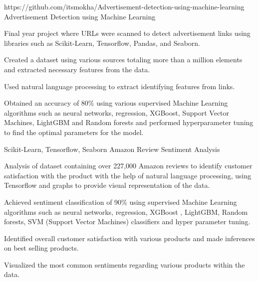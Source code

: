 \begin{cventries}
  \cventry
    {https://github.com/itsmokha/Advertisement-detection-using-machine-learning} %
    {Advertisement Detection using Machine Learning} %
    {}
    {}
    {
      \begin{cvitems} %
		\item Final year project where URLs were scanned to detect advertisement links using libraries such as Scikit-Learn, Tensorflow, Pandas, and Seaborn.
		\item Created a dataset using various sources totaling more than a million elements and extracted necessary features from the data.
		\item Used natural language processing to extract identifying features from links.
		\item Obtained an accuracy of 80\% using various supervised Machine Learning algorithms such as neural networks, regression, XGBoost, Support Vector Machines, LightGBM and Random forests and performed hyperparameter tuning to find the optimal parameters for the model.
      \end{cvitems}
    }

  \cventry
    {Scikit-Learn, Tensorflow, Seaborn} %
    {Amazon Review Sentiment Analysis} %
    {}
    {}
    {
      \begin{cvitems} %
		\item Analysis of dataset containing over 227,000 Amazon reviews to identify customer satisfaction with the product  with the help of natural language processing, using Tensorflow and graphs to provide visual representation of the data.
		\item Achieved sentiment classification of 90\% using supervised Machine Learning algorithms such as neural networks, regression, XGBoost , LightGBM, Random forests, SVM (Support Vector Machines) classifiers and hyper parameter tuning.
		\item Identified overall customer satisfaction with various products and made inferences on best selling products.
		\item Visualized the most common sentiments regarding various products within the data.
      \end{cvitems}
    }


\end{cventries}
